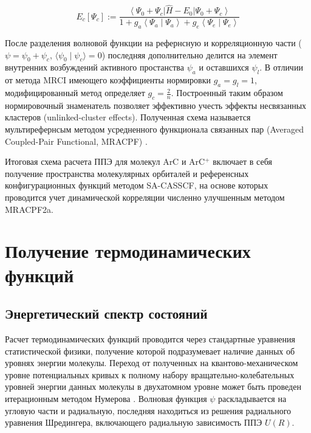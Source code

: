 \documentclass[12pt]{extarticle}
\begin{document}
    \begin{equation} \label{eq:acpf}
    	E_c\left[\Psi_c\right]:=\frac{\left\langle\Psi_0+\Psi_c\right| \hat{H}-E_0\left|\Psi_0+\Psi_c\right\rangle}{1+g_a\left\langle\Psi_a \mid \Psi_a\right\rangle+g_e\left\langle\Psi_e \mid \Psi_e\right\rangle}
    \end{equation}
    
    После разделения волновой функции на рефернсную и корреляционную части ($\psi = \psi_0 + \psi_c$, $\langle \psi_0 \mid \psi_c \rangle = 0$) последняя дополнительно делится на элемент внутренних возбуждений активного простанства $\psi_a$ и оставшихся $\psi_l$. В отличии от метода MRCI имеющего коэффициенты нормировки $g_a = g_l = 1$, модифицированный метод определяет $g_c = \frac{2}{n}$. Построенный таким образом нормировочный знаменатель позволяет эффективно учесть эффекты несвязанных кластеров (unlinked-cluster effects). Полученная схема называется мультирефернсым методом усредненного функционала связанных пар (Averaged Coupled-Pair Functional, MRACPF) \cite{gdanitz_acpf}.
    
    Итоговая схема расчета ППЭ для молекул ArC и ArC$^+$ включает в себя получение пространства молекулярных орбиталей и референсных конфигурационных функций методом SA-CASSCF, на основе которых проводится учет динамической корреляции численно улучшенным методом MRACPF2a.

    \newpage
    \section{Получение термодинамических функций}
    
    \subsection{Энергетический спектр состояний}
    \label{sec:Chapter2.1}

	Расчет термодинамических функций проводится через стандартные уравнения статистической физики, получение которой подразумевает наличие данных об уровнях энергии молекулы. Переход от полученных на квантово-механическом уровне потенциальных кривых к полному набору вращательно-колебательных уровней энергии данных молекулы в двухатомном уровне может быть проведен итерационным методом Нумерова \cite{numerov}. Волновая функция $\psi$ раскладывается на угловую части и радиальную, последняя находиться из решения радиального уравнения Шредингера, включающего радиальную зависимость ППЭ $U(R)$.
	
\end{document}
